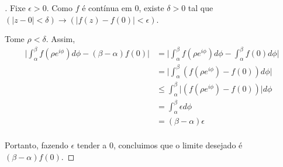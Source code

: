 \def\e{e}

\begin{proof}[]

Fixe $\epsilon>0$.
Como $f$ é contínua em $0$, existe $\delta>0$ tal que $(\lvert z-0 \rvert < \delta)\rightarrow(\lvert f(z)-f(0)\rvert<\epsilon)$.

Tome $\rho<\delta$.
Assim,
\begin{align*}
\lvert \int_{\alpha}^{\beta}f(\rho\e^{i\phi})d\phi -(\beta-\alpha)f(0)\rvert &= \lvert \int_{\alpha}^{\beta}f(\rho\e^{i\phi})d\phi -\int_{\alpha}^{\beta}f(0)d\phi \rvert  \\
&=\lvert \int_{\alpha}^{\beta}(f(\rho\e^{i\phi})-f(0))d\phi\rvert \\
&\leq \int_{\alpha}^{\beta}\lvert (f(\rho\e^{i\phi})-f(0))\rvert d\phi \\
&=\int_{\alpha}^{\beta}\epsilon d\phi \\
&=(\beta -\alpha)\epsilon \\
\end{align*}

Portanto, fazendo $\epsilon$ tender a $0$, concluimos que o limite desejado é $(\beta - \alpha)f(0)$.

\end{proof}


